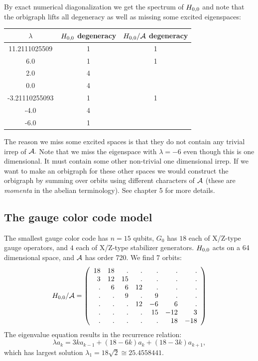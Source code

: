 By exact%
numerical diagonalization
we get the spectrum of $H_{0,0}$ and note that the orbigraph lifts
all degeneracy as well as missing some excited eigenspaces:
\begin{center}
\begin{tabular}{ c|c|c } 
$\lambda$ & $H_{0,0}$ degeneracy & $H_{0,0}/\mathcal{A}$ degeneracy \\
\hline
    11.2111025509 & 1 & 1 \\
    6.0 & 1 & 1 \\
    2.0 & 4 &   \\
    0.0 & 4 &   \\
    -3.21110255093 & 1 & 1 \\
    -4.0 & 4 &   \\
    -6.0 & 1 &   
\end{tabular}
\end{center}
The reason we miss some excited spaces is that they do not contain
any trivial irrep of $\mathcal{A}.$
Note that we miss the eigenspace with $\lambda = -6$
even though this is one dimensional. It must contain some other non-trivial
one dimensional irrep. 
If we want to make an orbigraph for these other spaces we would construct
the orbigraph by
summing over orbits using different characters of $\mathcal{A}$
(these are \emph{momenta} in the abelian terminology).
See \cite{Cvetkovic1980} chapter 5 for more details.

%
\subsection{The gauge color code model}
The smallest gauge color code has $n=15$ qubits,
$G_0$ has $18$ each of X/Z-type gauge operators,
and $4$ each of X/Z-type stabilizer generators.
$H_{0,0}$ acts on a 64 dimensional space, and $\mathcal{A}$ has
order 720. We find 7 orbits:
$$
H_{0,0}/\mathcal{A} = 
\left(\begin{array}{rrrrrrr}
18 & 18 &  . &  . &  . &  . &  . \cr
  3 & 12 & 15 &  . &  . &  . &  . \cr
  . &  6 &  6 & 12 &  . &  . &  . \cr
  . &  . &  9 &  . &  9 &  . &  . \cr
  . &  . &  . & 12 & -6 &  6 &  . \cr
  . &  . &  . &  . & 15 & -12 &  3 \cr
  . &  . &  . &  . &  . & 18 & -18
\end{array}\right)
$$
The eigenvalue equation results in
the recurrence relation:
$$
    \lambda a_k = 3ka_{k-1} + (18-6k)a_k + (18-3k)a_{k+1},
$$
which has largest solution 
$\lambda_1 = 18\sqrt{2} \cong 25.4558441.$

